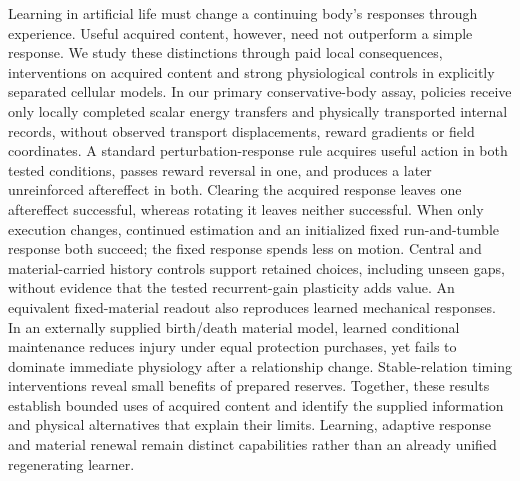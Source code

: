 Learning in artificial life must change a continuing body's responses through experience. Useful acquired content, however, need not outperform a simple response. We study these distinctions through paid local consequences, interventions on acquired content and strong physiological controls in explicitly separated cellular models. In our primary conservative-body assay, policies receive only locally completed scalar energy transfers and physically transported internal records, without observed transport displacements, reward gradients or field coordinates. A standard perturbation-response rule acquires useful action in both tested conditions, passes reward reversal in one, and produces a later unreinforced aftereffect in both. Clearing the acquired response leaves one aftereffect successful, whereas rotating it leaves neither successful. When only execution changes, continued estimation and an initialized fixed run-and-tumble response both succeed; the fixed response spends less on motion. Central and material-carried history controls support retained choices, including unseen gaps, without evidence that the tested recurrent-gain plasticity adds value. An equivalent fixed-material readout also reproduces learned mechanical responses. In an externally supplied birth/death material model, learned conditional maintenance reduces injury under equal protection purchases, yet fails to dominate immediate physiology after a relationship change. Stable-relation timing interventions reveal small benefits of prepared reserves. Together, these results establish bounded uses of acquired content and identify the supplied information and physical alternatives that explain their limits. Learning, adaptive response and material renewal remain distinct capabilities rather than an already unified regenerating learner.
